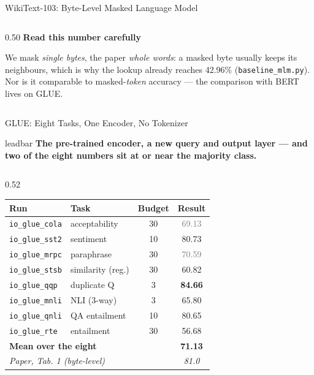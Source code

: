 \documentclass[aspectratio=169,11pt]{beamer}
\newcommand{\lead}[1]{%
  \begin{beamercolorbox}[wd=\textwidth,sep=5pt,center]{leadbar}%
    \small\bfseries #1%
  \end{beamercolorbox}\vspace{0.6em}}
\newcommand{\alerthead}[1]{{\color{AccentRed}\bfseries #1}\par\vspace{0.25em}}
\begin{document}
\begin{frame}[shrink=18]{WikiText-103: Byte-Level Masked Language Model}
\begin{columns}[T]
\begin{column}{0.50\textwidth}
      \vspace{0.3em}
      \alerthead{Read this number carefully}
        \scriptsize
        We mask \emph{single bytes}, the paper \emph{whole words}: a masked byte usually keeps its neighbours, which is why the lookup already reaches 42.96\% (\texttt{baseline\_mlm.py}). Nor is it comparable to masked-\emph{token} accuracy --- the comparison with BERT lives on GLUE.
      
    \end{column}
  \end{columns}
\end{frame}

\begin{frame}[shrink=11]{GLUE: Eight Tasks, One Encoder, No Tokenizer}
  \lead{The pre-trained encoder, a new query and output layer --- and two of the eight numbers sit at or near the majority class.}
  \begin{columns}[T,onlytextwidth]
    \begin{column}{0.52\textwidth}
      \begin{table}
        \centering\scriptsize
        \begin{tabular}{llcc}
          \toprule
          \textbf{Run} & \textbf{Task} & \textbf{Budget} & \textbf{Result} \\
          \midrule
          \texttt{io\_glue\_cola} & acceptability & 30 & \textcolor{gray}{69.13} \\
          \texttt{io\_glue\_sst2} & sentiment & 10 & 80.73 \\
          \texttt{io\_glue\_mrpc} & paraphrase & 30 & \textcolor{gray}{70.59} \\
          \texttt{io\_glue\_stsb} & similarity (reg.) & 30 & 60.82 \\
          \texttt{io\_glue\_qqp} & duplicate Q & 3 & \textbf{84.66} \\
          \texttt{io\_glue\_mnli} & NLI (3-way) & 3 & 65.80 \\
          \texttt{io\_glue\_qnli} & QA entailment & 10 & 80.65 \\
          \texttt{io\_glue\_rte} & entailment & 30 & 56.68 \\
          \midrule
          \multicolumn{3}{l}{\textbf{Mean over the eight}} & \textbf{71.13} \\
          \multicolumn{3}{l}{\textit{Paper, Tab. 1 (byte-level)}} & \textit{81.0} \\
          \bottomrule

\end{tabular}
\end{table}
\end{column}
\end{columns}
\end{frame}
\end{document}
